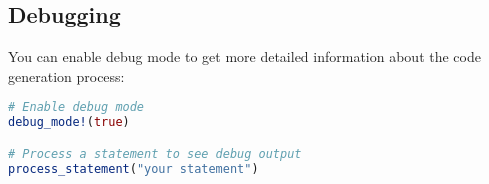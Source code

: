 \documentclass[11pt,a4paper]{article}
\makeatletter
\newcommand{\indexentry}[2]{\index{#1@\texttt{#1} #2}}
\newcommand{\indexfunc}[1]{\indexentry{#1}{function}}
\newcommand{\func}[1]{\texttt{#1}}
\makeatother
\begin{document}
\subsection{Debugging}

You can enable debug mode to get more detailed information about the code generation process:

\begin{lstlisting}[language=Julia]
# Enable debug mode
debug_mode!(true)

# Process a statement to see debug output
process_statement("your statement")
\end{lstlisting}



    
    
    

\end{document}
